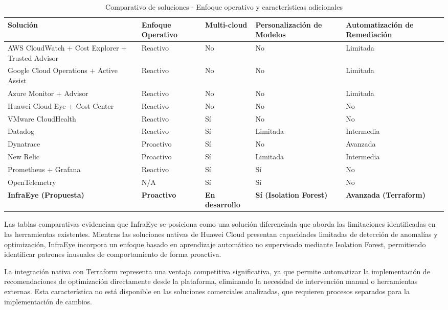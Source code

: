 \begin{table}[H]
\centering
\scriptsize
\begin{tabular}{|p{2.5cm}|p{2.5cm}|p{2.5cm}|p{2.5cm}|p{2.5cm}|}
\hline
\textbf{Solución} & \textbf{Enfoque Operativo} & \textbf{Multi-cloud} & \textbf{Personalización de Modelos} & \textbf{Automatización de Remediación} \\
\hline
AWS CloudWatch + Cost Explorer + Trusted Advisor & Reactivo & No & No & Limitada \\
\hline
Google Cloud Operations + Active Assist & Reactivo & No & No & Limitada \\
\hline
Azure Monitor + Advisor & Reactivo & No & No & Limitada \\
\hline
Huawei Cloud Eye + Cost Center & Reactivo & No & No & No \\
\hline
VMware CloudHealth & Reactivo & Sí & No & No \\
\hline
Datadog & Reactivo & Sí & Limitada & Intermedia \\
\hline
Dynatrace & Proactivo & Sí & No & Avanzada \\
\hline
New Relic & Proactivo & Sí & Limitada & Intermedia \\
\hline
Prometheus + Grafana & Reactivo & Sí & Sí & No \\
\hline
OpenTelemetry & N/A & Sí & Sí & No \\
\hline
\textbf{InfraEye (Propuesta)} & \textbf{Proactivo} & \textbf{En desarrollo} & \textbf{Sí (Isolation Forest)} & \textbf{Avanzada (Terraform)} \\
\hline
\end{tabular}
\caption{Comparativo de soluciones - Enfoque operativo y características adicionales}
\label{tab:comparativo2}
\end{table}

Las tablas comparativas evidencian que InfraEye se posiciona como una solución diferenciada que aborda las limitaciones identificadas en las herramientas existentes. Mientras las soluciones nativas de Huawei Cloud presentan capacidades limitadas de detección de anomalías y optimización, InfraEye incorpora un enfoque basado en aprendizaje automático no supervisado mediante Isolation Forest, permitiendo identificar patrones inusuales de comportamiento de forma proactiva.

La integración nativa con Terraform representa una ventaja competitiva significativa, ya que permite automatizar la implementación de recomendaciones de optimización directamente desde la plataforma, eliminando la necesidad de intervención manual o herramientas externas. Esta característica no está disponible en las soluciones comerciales analizadas, que requieren procesos separados para la implementación de cambios.

